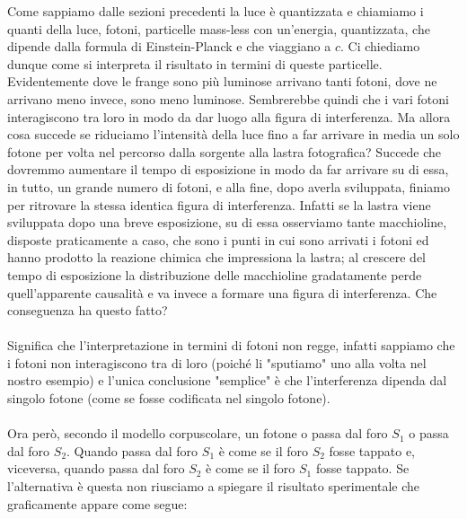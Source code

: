 	Come sappiamo dalle sezioni precedenti la luce è quantizzata e chiamiamo i quanti della luce, fotoni, particelle mass-less con un'energia, quantizzata, che dipende dalla formula di Einstein-Planck e che viaggiano a $c$. Ci chiediamo dunque come si interpreta il risultato in termini di queste particelle. Evidentemente dove le frange sono più luminose arrivano tanti fotoni, dove ne arrivano meno invece, sono meno luminose. Sembrerebbe quindi che i vari fotoni interagiscono tra loro in modo da dar luogo alla figura di interferenza. Ma allora cosa succede se riduciamo l'intensità della luce fino a far arrivare in media un solo fotone per volta nel percorso dalla sorgente alla lastra fotografica? Succede che dovremmo aumentare il tempo di esposizione in modo da far arrivare su di essa, in tutto, un grande numero di fotoni, e alla fine, dopo averla sviluppata, finiamo per ritrovare la stessa identica figura di interferenza. Infatti se la lastra viene sviluppata dopo una breve esposizione, su di essa osserviamo tante macchioline, disposte praticamente a caso, che sono i punti in cui sono arrivati i fotoni ed hanno prodotto la reazione chimica che impressiona la lastra; al crescere del tempo di esposizione la distribuzione delle macchioline gradatamente perde quell'apparente causalità e va invece a formare una figura di interferenza. Che conseguenza ha questo fatto?
	\\
	\\
	Significa che l'interpretazione in termini di fotoni non regge, infatti sappiamo che i fotoni non interagiscono tra di loro (poiché li "sputiamo" uno alla volta nel nostro esempio) e l'unica conclusione "semplice" è che l'interferenza dipenda dal singolo fotone (come se fosse codificata nel singolo fotone). 
	\\
	\\
	Ora però, secondo il modello corpuscolare, un fotone o passa dal foro $S_1$ o passa dal foro $S_2$. Quando passa dal foro $S_1$ è come se il foro $S_2$ fosse tappato e, viceversa, quando passa dal foro $S_2$ è come se il foro $S_1$ fosse tappato. Se l'alternativa è questa non riusciamo a spiegare il risultato sperimentale che graficamente appare come segue:

